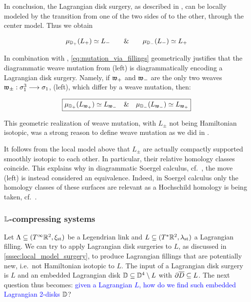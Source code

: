 In conclusion, the Lagrangian disk surgery, as described in , can be locally modeled by the transition from one of the two sides of  to the other, through the center model. Thus we obtain

\begin{equation}\label{eq:mutation_via_fillings}
       \mu_{\mathbb{D}_+}(L_+)\simeq L_-\qquad\&\qquad\mu_{\mathbb{D}_-}(L_-)\simeq L_+
\end{equation}

\noindent In combination with , \eqref{eq:mutation_via_fillings} geometrically justifies that the diagrammatic weave mutation from  (left) is diagrammatically encoding a Lagrangian disk surgery. Namely, if $\mathfrak{w}_+$ and $\mathfrak{w}_-$ are the only two weaves $\mathfrak{w}_\pm:\sigma_1^3\longrightarrow\sigma_1$,  (left), which differ by a weave mutation, then:

        \begin{equation}\label{eq:mutation_via_fillings}
        \fbox{$\mu_{\mathbb{D}_+}(L_{\mathfrak{w}_+})\simeq L_{\mathfrak{w}_-}\quad\&\quad \mu_{\mathbb{D}_-}(L_{\mathfrak{w}_-})\simeq L_{\mathfrak{w}_+}$}
        \end{equation}

\noindent This geometric realization of weave mutation, with $L_\pm$ not being Hamiltonian isotopic, was a strong reason to define weave mutation as we did in .

\begin{remark}
It follows from the local model above that $L_\pm$ are actually compactly supported smoothly isotopic to each other. In particular, their relative homology classes coincide. This explains why in diagrammatic Soergel calculus, cf.~\cite{EliasWilliamson2016Calculus,EMTW2020}, the move  (left) is instead considered an equivalence. Indeed, in Soergel calculus only the homology classes of these surfaces are relevant as a Hochschild homology is being taken, cf.~\cite{Webster_2008}.\sbs
\end{remark}


\subsubsection{$\mathbb{L}$-compressing systems}\label{sssec:L_compressing_systems} Let $\Lambda\subseteq(T^\infty\mathbb{R}^2,\xi_{\text{st}})$ be a Legendrian link and $L\subseteq (T^*\mathbb{R}^2,\lambda_{\text{st}})$ a Lagrangian filling. We can try to apply Lagrangian disk surgeries to $L$, as discussed in \cref{sssec:local_model_surgery}, to produce Lagrangian fillings that are potentially new, i.e.~not Hamiltonian isotopic to $L$. The input of a Lagrangian disk surgery is $L$ and an embedded Lagrangian disk $\mathbb{D}\subseteq\mathbb{D}^4\setminus L$ with $\partial\overline{D}\subseteq L$. The next question thus becomes: \textcolor{blue}{given a Lagrangian $L$, how do we find such embedded Lagrangian 2-disks $\mathbb{D}$}?\\

